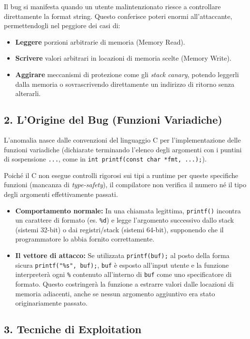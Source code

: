 \documentclass{article}
\begin{document}
Il bug si manifesta quando un utente malintenzionato riesce a controllare direttamente la format string. Questo conferisce poteri enormi all'attaccante, permettendogli nel peggiore dei casi di:
\begin{itemize}
    \item \textbf{Leggere} porzioni arbitrarie di memoria (Memory Read).
    \item \textbf{Scrivere} valori arbitrari in locazioni di memoria scelte (Memory Write).
    \item \textbf{Aggirare} meccanismi di protezione come gli \emph{stack canary}, potendo leggerli dalla memoria o sovrascrivendo direttamente un indirizzo di ritorno senza alterarli.
\end{itemize}

\subsection{2. L'Origine del Bug (Funzioni Variadiche)}
L'anomalia nasce dalle convenzioni del linguaggio C per l'implementazione delle funzioni variadiche (dichiarate terminando l'elenco degli argomenti con i puntini di sospensione \texttt{...}, come in \texttt{int printf(const char *fmt, ...);}). 

Poiché il C non esegue controlli rigorosi sui tipi a runtime per queste specifiche funzioni (mancanza di \emph{type-safety}), il compilatore non verifica il numero né il tipo degli argomenti effettivamente passati.
\begin{itemize}
    \item \textbf{Comportamento normale:} In una chiamata legittima, \texttt{printf()} incontra un carattere di formato (es. \texttt{\%d}) e legge l'argomento successivo dallo stack (sistemi 32-bit) o dai registri/stack (sistemi 64-bit), supponendo che il programmatore lo abbia fornito correttamente.
    \item \textbf{Il vettore di attacco:} Se utilizzata \texttt{printf(buf);} al posto della forma sicura \texttt{printf("\%s", buf);}, \texttt{buf} è esposto all'input utente e la funzione interpreterà ogni \texttt{\%} contenuto all'interno di \texttt{buf} come uno specificatore di formato. Questo costringerà la funzione a estrarre valori dalle locazioni di memoria adiacenti, anche se nessun argomento aggiuntivo era stato originariamente passato.
\end{itemize}

\subsection{3. Tecniche di Exploitation}
\end{document}

